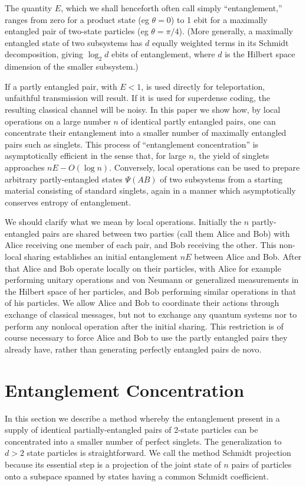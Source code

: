 The quantity $E$, which we shall henceforth often call simply
``entanglement,'' ranges from zero for a product state (eg $\theta=0$)
to 1 ebit for a maximally entangled pair of two-state particles (eg
$\theta=\pi/4$).  (More generally, a maximally entangled state
of two subsystems has $d$ equally weighted terms in its Schmidt
decomposition, giving $\log_2d$ ebits of entanglement, where $d$ is
the Hilbert space dimension of the smaller subsystem.)
 
If a partly entangled pair, with $E < 1$, is used directly for
teleportation, unfaithful transmission will result.  If it is
used for superdense coding, the resulting classical channel will
be noisy.  In this paper we show how, by local operations on a large
number $n$ of identical partly entangled pairs, one can concentrate
their entanglement into a smaller number of maximally entangled pairs
such as singlets.  This process of ``entanglement concentration'' is
asymptotically efficient in the sense that, for large $n$, the yield
of singlets approaches $nE-O(\log n)$.  Conversely, local operations can be used
to prepare arbitrary partly-entangled states $\Psi(AB)$ of two
subsystems from a starting material consisting of standard
singlets, again in a manner which asymptotically conserves entropy
of entanglement.
 
We should clarify what we mean by local operations.  Initially
the $n$ partly-entangled pairs are shared between two parties
(call them Alice and Bob) with Alice receiving one member of each pair,
and Bob receiving the other.  This
non-local sharing establishes an initial entanglement
$nE$ between Alice and Bob.  After that Alice and Bob operate
locally on their particles, with Alice for example performing
unitary operations and von Neumann or generalized measurements in
the Hilbert space of her particles, and Bob
performing similar operations in that of his particles.
We allow Alice and Bob to coordinate their actions through
exchange of classical messages, but not to exchange
any quantum systems nor to perform any nonlocal operation after
the initial sharing.  This restriction is of course necessary to
force Alice and Bob to use the partly entangled pairs they
already have, rather than generating perfectly entangled pairs de
novo.
 
 
\section{Entanglement Concentration}
In this section we describe a method whereby the entanglement present in a
supply of identical partially-entangled pairs of 2-state particles can be
concentrated into a smaller number of perfect singlets.  The generalization
to $d>2$ state particles is straightforward.  We call the method Schmidt
projection because its essential step is a projection of the joint state of
$n$ pairs of particles onto a subspace spanned by states having a common Schmidt
coefficient.
 
